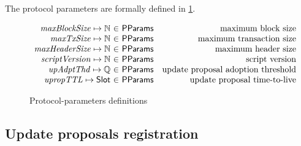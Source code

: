 The protocol parameters are formally defined in \cref{fig:prot-params-defs}.

\begin{figure}[ht]
  \begin{equation*}
    \begin{array}{r@{~\in~}lr}
      \var{maxBlockSize} \mapsto \mathbb{N} & \PPMMap & \text{maximum block size}\\
      \var{maxTxSize} \mapsto \mathbb{N} & \PPMMap & \text{maximum transaction size}\\
      \var{maxHeaderSize} \mapsto \mathbb{N} & \PPMMap & \text{maximum header size}\\
      \var{scriptVersion} \mapsto \mathbb{N} & \PPMMap & \text{script version}\\
      \var{upAdptThd} \mapsto \mathbb{Q} & \PPMMap & \text{update proposal adoption threshold}\\
      \var{upropTTL} \mapsto \mathbb{\Slot} & \PPMMap & \text{update proposal time-to-live}\\
    \end{array}
  \end{equation*}
  \caption{Protocol-parameters definitions}
  \label{fig:prot-params-defs}
\end{figure}

\subsection{Update proposals registration}
\label{sec:update-proposals-registration}

